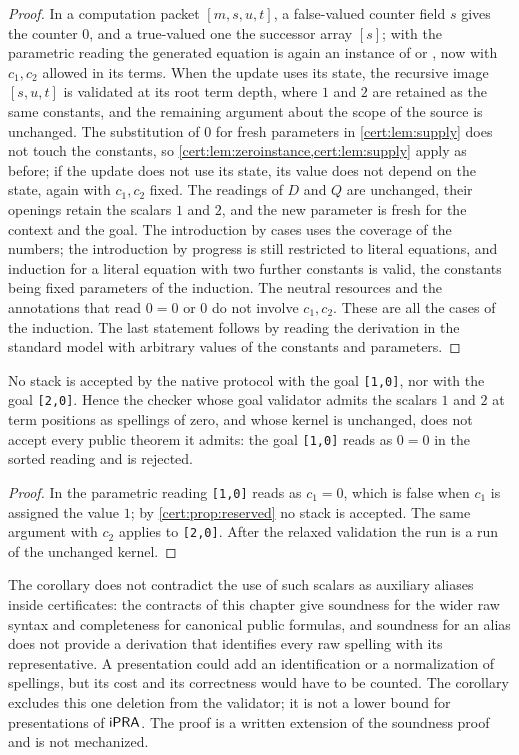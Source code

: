 \begin{proof}
In a computation packet $[m,s,u,t]$, a false-valued counter field $s$ gives
the counter $0$, and a true-valued one the successor array $[s]$; with the
parametric reading the generated equation is again an instance of
 or , now with $c_1,c_2$ allowed in its terms. When
the update uses its state, the recursive image $[s,u,t]$ is validated at its
root term depth, where $1$ and $2$ are retained as the same constants, and the
remaining argument about the scope of the source is unchanged. The
substitution of $0$ for fresh parameters in \cref{cert:lem:supply} does not
touch the constants, so \cref{cert:lem:zeroinstance,cert:lem:supply} apply as
before; if the update does not use its state, its value does not depend on the
state, again with $c_1,c_2$ fixed. The readings of $D$ and $Q$ are unchanged,
their openings retain the scalars $1$ and $2$, and the new parameter is fresh
for the context and the goal. The introduction by cases uses the coverage of
the numbers; the introduction by progress is still restricted to literal
equations, and induction for a literal equation with two further constants is
valid, the constants being fixed parameters of the induction. The neutral
resources and the annotations that read $0=0$ or $0$ do not involve $c_1,c_2$.
These are all the cases of the induction. The last statement follows by
reading the derivation in the standard model with arbitrary values of the
constants and parameters.
\end{proof}

\begin{corollary}\label{cert:cor:reserved}
No stack is accepted by the native protocol with the goal \texttt{[1,0]}, nor
with the goal \texttt{[2,0]}. Hence the checker whose goal validator admits
the scalars $1$ and $2$ at term positions as spellings of zero, and whose
kernel is unchanged, does not accept every public theorem it admits: the goal
\texttt{[1,0]} reads as $0=0$ in the sorted reading and is rejected.
\end{corollary}
\begin{proof}
In the parametric reading \texttt{[1,0]} reads as $c_1=0$, which is false when
$c_1$ is assigned the value $1$; by \cref{cert:prop:reserved} no stack is
accepted. The same argument with $c_2$ applies to \texttt{[2,0]}. After the
relaxed validation the run is a run of the unchanged kernel.
\end{proof}

The corollary does not contradict the use of such scalars as auxiliary aliases
inside certificates: the contracts of this chapter give soundness for the
wider raw syntax and completeness for canonical public formulas, and soundness
for an alias does not provide a derivation that identifies every raw spelling
with its representative. A presentation could add an identification or a
normalization of spellings, but its cost and its correctness would have to be
counted. The corollary excludes this one deletion from the validator; it is
not a lower bound for presentations of $\mathsf{iPRA}$. The proof is a written
extension of the soundness proof and is not mechanized.


